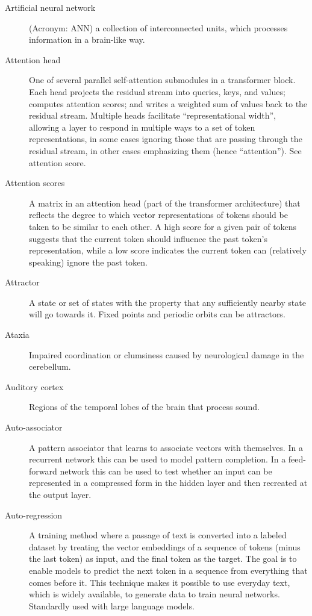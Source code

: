 \begin{description}
\item[Artificial neural network] (Acronym: ANN) a collection of interconnected units, which processes information in a brain-like way.

\item[Attention head] One of several parallel self-attention submodules in a transformer block. Each head  projects the residual stream into queries, keys, and values; computes attention scores; and writes a weighted sum of values back to the residual stream. Multiple heads facilitate ``representational width'', allowing a layer to respond in multiple ways to a set of token representations, in some cases ignoring those that are passing through the residual stream, in other cases emphasizing them (hence ``attention'').  See attention score.

\item[Attention scores] A matrix in an attention head (part of the transformer architecture) that reflects the degree to which vector representations of tokens should be taken to be similar to each other. A high score for a given pair of tokens suggests that the current token should influence the past token’s representation, while a low score indicates the current token can (relatively speaking) ignore the past token.

\item[Attractor] A state or set of states with the property that any  sufficiently nearby state will go towards it. Fixed points and periodic orbits can be attractors.

\item[Ataxia] Impaired coordination or clumsiness caused by neurological damage in the cerebellum.

\item[Auditory cortex] Regions of the temporal lobes of the brain that process sound. 

\item[Auto-associator] A pattern associator that learns to associate vectors with themselves. In a recurrent network this can be used to model pattern completion. In a feed-forward network this can be used to test whether an input can be represented in a compressed form in the hidden layer and then recreated at the output layer. 

\item[Auto-regression] A training method where a passage of text is converted into a labeled dataset by treating the vector embeddings of a sequence of tokens (minus the last token) as input, and the final token as the target. The goal is to enable models to predict the next token in a sequence from everything that comes before it. This technique makes it possible to use everyday text, which is widely available, to generate data to train neural networks. Standardly used with large language models.


\end{description}
